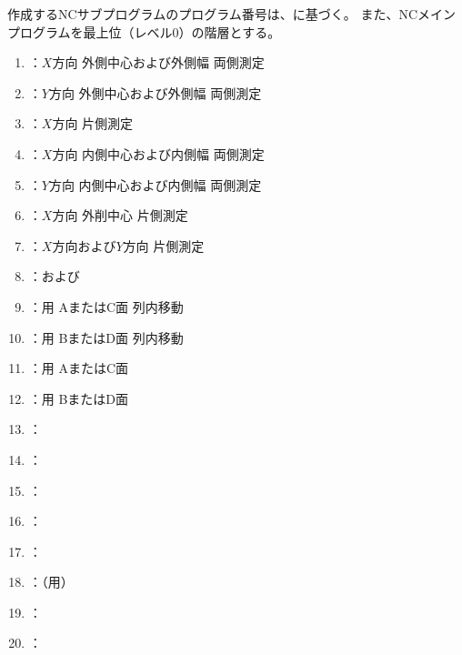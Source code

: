 

作成するNCサブプログラムのプログラム番号は、に基づく。
また、NCメインプログラムを最上位（レベル0）の階層とする。



\begin{enumerate}[label*=\sarrow]
\item \MXOThickness：$X$方向 外側中心および外側幅 両側測定
\item \MYOThickness：$Y$方向 外側中心および外側幅 両側測定
\item \MXOface：$X$方向 \KeywayCenter{} 片側測定
\item \MXIWidth：$X$方向 内側中心および内側幅 両側測定
\item \MYIWidth：$Y$方向 内側中心および内側幅 両側測定
\item \MXIface：$X$方向 外削中心 片側測定
\item \MCenterline：$X$方向および$Y$方向 \CenterlineEndFaceDif{} 片側測定
\item \DLone：\DimpleMeasurement および\DimpleMilling
\item \DLtwoAC：\DLone 用 AまたはC面 \Dimple 列内移動
\item \DLtwoBD：\DLone 用 BまたはD面 \Dimple 列内移動
\item \DMLthreeAC：\DLtwoAC 用 AまたはC面 \DimpleMeasurement
\item \DMLthreeBD：\DLtwoBD 用 BまたはD面 \DimpleMeasurement
\item \KEndFaceRight：\EndFacecutMilling
\item \KOutcutRLeft：\OutcutMilling
\item \KCurvedOutcutRLeft：\CurvedOutcutMilling
\item \KKeywayConerLeft：\KeywayMilling
\item \KEndFaceOutCChamferRLeft：\EndFaceOutCChamferMilling
\item \KEndFaceCurvedOutCChamferRLeft：\EndFaceOutCChamferMilling（\CurvedOutcut 用）
\item \KEndFaceInCChamferRLeft：\EndFaceInCChamferMilling
\item \KEndFaceBoring：\EndFaceBoringMilling

\end{enumerate}
